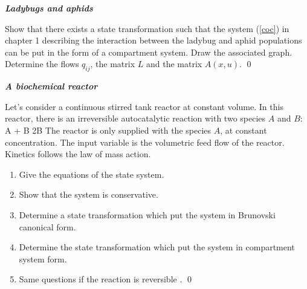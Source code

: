 \begin{exercice}{\bf \em Ladybugs and aphids}

Show that there exists a state transformation such that the system (\ref{coc}) in chapter 1 describing the interaction between the ladybug and aphid populations can be put in the form of a compartment system. Draw the associated graph. Determine the flows $q_{ij}$, the matrix $L$ and the matrix   $A(x,u)$. \qed
\end{exercice}
\vv

\begin{exercice}{{\bf \em A biochemical reactor}}

Let's consider a continuous stirred tank reactor at constant volume. In this reactor, there is an irreversible autocatalytic reaction with two species 
 $A$ and $B$:
\e
A + B \longrightarrow 2B
\ee
The reactor is only supplied with the species $A$, at constant concentration. The input variable is the volumetric feed flow of the reactor. Kinetics follows the law of mass action.

\begin{enumerate}
\item Give the equations of the state system.
\item Show that the system is conservative.
\item Determine a state transformation which put the system in Brunovski canonical form.
\item Determine the state transformation which put the system in compartment system form.
\item Same questions if the reaction is reversible . \qed
\end{enumerate}
\end{exercice}
\vv

